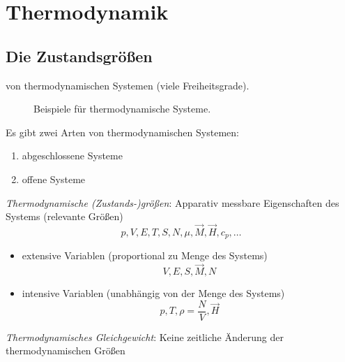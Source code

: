 \section{Thermodynamik}
\subsection{Die Zustandsgrößen}
von thermodynamischen Systemen (viele Freiheitsgrade).

\begin{figure}[H]
    \centering
    \def\svgwidth{0.7\textwidth}
    
    \caption{Beispiele für thermodynamische Systeme.}
    \label{img:exampleSystems}
\end{figure}

Es gibt zwei Arten von thermodynamischen Systemen:
\begin{enumerate}
    \item abgeschlossene Systeme
    \item offene Systeme
\end{enumerate}
\emph{Thermodynamische (Zustands-)größen}:
Apparativ messbare Eigenschaften des Systems (relevante Größen)
\begin{equation}
    p, V, E, T, S, N, \mu, \vec{M}, \vec{H}, c_p, \ldots
\end{equation}
\begin{itemize}
    \item extensive Variablen (proportional zu Menge des Systems)
    \begin{equation}
        V, E, S, \vec{M}, N
    \end{equation}
    \item intensive Variablen (unabhängig von der Menge des Systems)
    \begin{equation}
        p, T, \rho=\frac{N}{V}, \vec{H}
    \end{equation}
\end{itemize}
\emph{Thermodynamisches Gleichgewicht}: Keine zeitliche Änderung der thermodynamischen Größen

